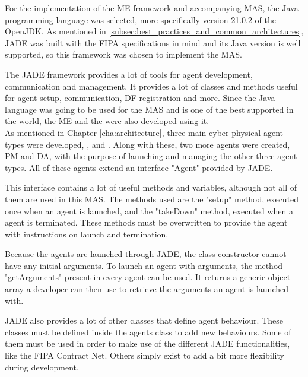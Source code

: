 For the implementation of the \acrlong{ME} framework and accompanying \acrshort{MAS}, the Java programming language was selected, more specifically version 21.0.2 of the OpenJDK. As mentioned in \ref{subsec:best_practices_and_common_architectures}, \acrshort{JADE} was built with the \acrshort{FIPA} specifications in mind and its Java version is well supported, so this framework was chosen to implement the \acrlong{MAS}.

The \acrshort{JADE} framework provides a lot of tools for agent development, communication and management. It provides a lot of classes and methods useful for agent setup, communication, \acrshort{DF} registration and more. Since the Java language was going to be used for the \acrshort{MAS} and is one of the best supported in the world, the \acrlong{ME} and the  were also developed using it.\\

As mentioned in Chapter \ref{cha:architecture}, three main cyber-physical agent types were developed, ,  and . Along with these, two more agents were created, \acrfull{PM} and \acrfull{DA}, with the purpose of launching and managing the other three agent types. All of these agents extend an interface "Agent" provided by \acrshort{JADE}.

This interface contains a lot of useful methods and variables, although not all of them are used in this \acrshort{MAS}. The methods used are the "setup" method, executed once when an agent is launched, and the "takeDown" method, executed when a agent is terminated. These methods must be overwritten to provide the agent with instructions on launch and termination.

Because the agents are launched through \acrshort{JADE}, the class constructor cannot have any initial arguments. To launch an agent with arguments, the method "getArguments" present in every agent can be used. It returns a generic object array a developer can then use to retrieve the arguments an agent is launched with.

\acrshort{JADE} also provides a lot of other classes that define agent behaviour. These classes must be defined inside the agents class to add new behaviours. Some of them must be used in order to make use of the different \acrshort{JADE} functionalities, like the \acrshort{FIPA} Contract Net. Others simply exist to add a bit more flexibility during development.\\

